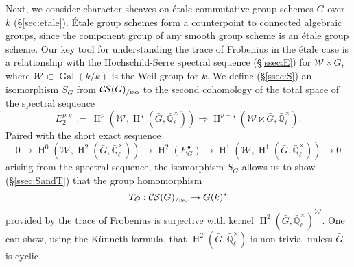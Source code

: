 \documentclass[10pt]{amsart}
\theoremstyle{plain}
\theoremstyle{definition}
\theoremstyle{remark}
\newcommand{\EE}{\mathbb{\bar Q}_\ell}
\newcommand{\bFq}{\bar{k}}
\newcommand{\Fq}{k}
\newcommand{\EEx}{\EE^\times}
\newcommand{\Weil}[1]{\mathcal{W}_{#1}}
\DeclareMathOperator{\Gal}{Gal}
\DeclareMathOperator{\Hom}{Hom}
\DeclareMathOperator{\Hh}{H}
\newcommand{\ceq}{{\, :=\, }}
\newcommand{\TrFrob}[1]{T_{#1}}
\newcommand{\gcs}[1]{{\mathcal{\bar #1}}}
\newcommand{\CS}{{\mathcal{C\hskip-0.8pt S}}}
\newcommand{\CSiso}[1]{\CS(#1)_{/\text{iso}}}
\newcommand{\bG}{\bar{G}}
\begin{document}
Next, we consider character sheaves on \'etale commutative group schemes $G$ over $\Fq$ (\S\ref{sec:etale}).
\'Etale group schemes form a counterpoint to connected algebraic groups, since the component group of any smooth group scheme is an \'etale group scheme.
Our key tool for understanding the trace of Frobenius in the \'etale case 
is a relationship with the Hochschild-Serre spectral sequence (\S\ref{ssec:E}) for $\Weil{} \ltimes \bG$, where $\Weil{} \subset \Gal(\Fq/\Fq)$ is the Weil group for $\Fq$.
We define (\S\ref{ssec:S}) an isomorphism $S_G$ from $\CSiso{G}$ to the second cohomology of the total space of the spectral sequence
\[
E_2^{p,q} \ceq \Hh^p(\Weil{}, \Hh^q(\bG, \EEx)) \Rightarrow \Hh^{p+q}(\Weil{} \ltimes \bG, \EEx).
\]
Paired with the short exact sequence
\[
  0 \to \Hh^0(\Weil{},\Hh^2({\bar G},\EEx)) \to \Hh^2(E^\bullet_G) \to \Hh^1(\Weil{},\Hh^1({\bar G},\EEx)) \to 0
\]
arising from the spectral sequence, the isomorphism $S_G$ allows us to show (\S\ref{ssec:SandT}) that 
the group homomorphism 
\[
\TrFrob{G}: \CSiso{G} \to G(\Fq)^*
\]
provided by the trace of Frobenius is surjective with kernel $\Hh^2(\bG,\EEx)^{\Weil{}}$.
One can show, using the K\"unneth formula, that $\Hh^2(\bG,\EEx)$ is non-trivial unless $\bG$ is cyclic.


\end{document}
